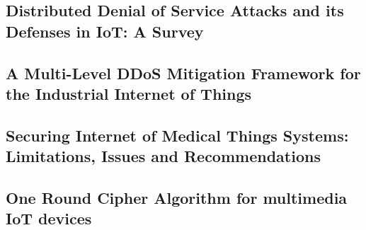 \subsection{Distributed Denial of Service Attacks and its Defenses in IoT: A
Survey}



\subsection{A Multi-Level DDoS Mitigation Framework for the Industrial Internet
of Things}



\subsection{Securing Internet of Medical Things Systems: Limitations, Issues and
Recommendations}



\subsection{One Round Cipher Algorithm for multimedia IoT devices}


